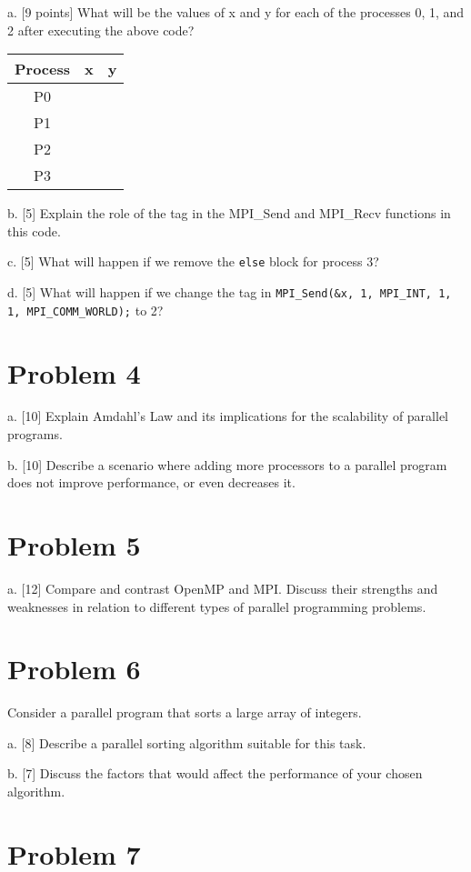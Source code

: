 \documentclass{article}
\begin{document}
a. [9 points] What will be the values of x and y for each of the processes 0, 1, and 2 after executing the above code?


\begin{tabular}{|c|c|c|}
\hline
Process & x & y \\
\hline
P0 &  &  \\
\hline
P1 &  &  \\
\hline
P2 &  &  \\
\hline
P3 &  &  \\
\hline
\end{tabular}

b. [5]  Explain the role of the tag in the MPI\_Send and MPI\_Recv functions in this code.

c. [5] What will happen if we remove the \texttt{else} block for process 3?

d. [5] What will happen if we change the tag in \texttt{MPI\_Send(&x, 1, MPI_INT, 1, 1, MPI_COMM_WORLD);} to 2?


\section*{Problem 4}

a. [10] Explain Amdahl's Law and its implications for the scalability of parallel programs.

b. [10]  Describe a scenario where adding more processors to a parallel program does not improve performance, or even decreases it.


\section*{Problem 5}

a. [12] Compare and contrast OpenMP and MPI.  Discuss their strengths and weaknesses in relation to different types of parallel programming problems.


\section*{Problem 6}

Consider a parallel program that sorts a large array of integers.

a. [8]  Describe a parallel sorting algorithm suitable for this task.

b. [7] Discuss the factors that would affect the performance of your chosen algorithm.


\section*{Problem 7}
\end{document}
